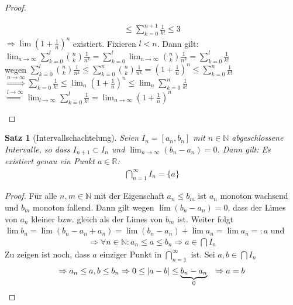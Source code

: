 \documentclass[ngerman,titlepage,twoside, parskip=half*]{scrreprt}
\newcommand*{\N}{\mathbb{N}}
\newcommand*{\R}{\mathbb{R}}
\theoremstyle{break}
\newtheorem{theorem}{Satz}[section]
\theoremstyle{nonumberbreak}
\newtheorem{proof}{Beweis:}
\DeclarePairedDelimiter{\abs}{\lvert}{\rvert}
\begin{document}
\begin{proof}
\begin{enumerate}
\begin{gather*}
    \leq \sum_{k=0}^{n+1} \frac{1}{k!} \leq 3\end{gather*}
    $\Rightarrow \lim \left(1+\frac{1}{n}\right)^n$ existiert. Fixieren $l<n$.
    Dann gilt:\\
    $\lim_{n \rightarrow \infty} \sum_{k=0}^l \binom{n}{k} \frac{1}{n^k}
    = \sum_{k=0}^l \lim_{n \rightarrow \infty} \binom{n}{k} \frac{1}{n^k} = 
    \sum_{k=0}^l \frac{1}{k!}$\\
    wegen $\sum_{k=0}^l \binom{n}{k} \frac{1}{n^k}
    \leq \sum_{k=0}^n \binom{n}{k} \frac{1}{n^k}=\left( 1+\frac{1}{n}\right)^n
    \leq \sum_{k=0}^n \frac{1}{k!}$\\
    $\overset{n \rightarrow \infty}{\Rightarrow}\sum_{k=0}^l \frac{1}{k!} \leq
    \lim_n \left(1+\frac{1}{n}\right)^n \leq \lim_n \sum_{k=0}^n \frac{1}{k!}$\\
    $\overset{l \rightarrow \infty}{\Rightarrow} \lim_{l \rightarrow \infty}
    \sum_{k=0}^l \frac{1}{k!} = \lim_{n \rightarrow \infty} \left(1+\frac{1}{n}
    \right)^n$
\end{enumerate}
\end{proof}

\begin{theorem}[Intervallschachtelung]
  \label{satz:Ischachtelung}
  Seien $I_n=[a_n,b_n]$ mit $n \in \N$ abgeschlossene Intervalle, so
  dass $I_{n+1} \subset I_n$ und $\lim_{n \rightarrow \infty}
  (b_n-a_n)=0$. Dann gilt: Es existiert genau ein Punkt $a \in \R$:
  \begin{gather*}\bigcap_{n=1}^{\infty} I_n = \{a\}\end{gather*}
\end{theorem}
\begin{proof}
  Für alle $n,m \in \N$ mit der Eigenschaft $a_n \leq b_m$ ist $a_n $
  monoton wachsend und $b_m$ monoton fallend. Dann gilt wegen $\lim
  (b_n-a_n)=0$, dass der Limes von $a_n$ kleiner bzw. gleich als der
  Limes von $b_m$ ist. Weiter folgt $\lim b_n = \lim
  (b_n-a_n+a_n)=\lim(b_n-a_n)+\lim a_n=\lim a_n=:a$ und
  \begin{gather*}\Rightarrow \forall n \in \N \colon a_n \leq a \leq b_n \Rightarrow a \in
  \bigcap I_n\end{gather*}
  Zu zeigen ist noch, dass $a$ einziger Punkt in
  $\bigcap_{n=1}^\infty$ ist. Sei $a,b \in \bigcap I_n$
\begin{align*}
  \Rightarrow a_n \leq a,b \leq b_n & \Rightarrow 0 \leq \abs{a-b} \leq
  \underbrace{b_n-a_n}_{0} & \Rightarrow a = b
\end{align*}
\end{proof}
\end{document}
